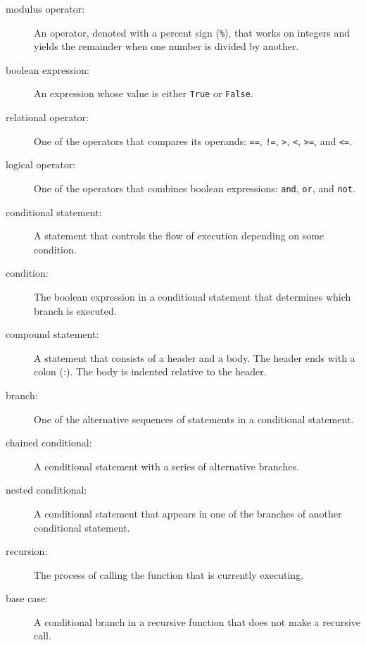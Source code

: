 \documentclass[10pt]{book}
\begin{document}
\begin{CJK}{UTF8}{gbsn}
\begin{description}
\item[modulus operator:]  An operator, denoted with a percent sign
({\tt \%}), that works on integers and yields the remainder when one
number is divided by another.

\item[boolean expression:]  An expression whose value is either 
{\tt True} or {\tt False}.

\item[relational operator:] One of the operators that compares
its operands: {\tt ==}, {\tt !=}, {\tt >}, {\tt <}, {\tt >=}, and {\tt <=}.

\item[logical operator:] One of the operators that combines boolean
expressions: {\tt and}, {\tt or}, and {\tt not}.

\item[conditional statement:]  A statement that controls the flow of
execution depending on some condition.

\item[condition:] The boolean expression in a conditional statement
that determines which branch is executed.

\item[compound statement:]  A statement that consists of a header
and a body.  The header ends with a colon (:).  The body is indented
relative to the header.

\item[branch:] One of the alternative sequences of statements in
a conditional statement.

\item[chained conditional:]  A conditional statement with a series
of alternative branches.

\item[nested conditional:]  A conditional statement that appears
in one of the branches of another conditional statement.

\item[recursion:]  The process of calling the function that is
currently executing.

\item[base case:]  A conditional branch in a
recursive function that does not make a recursive call.


\end{description}
\end{CJK}
\end{document}
